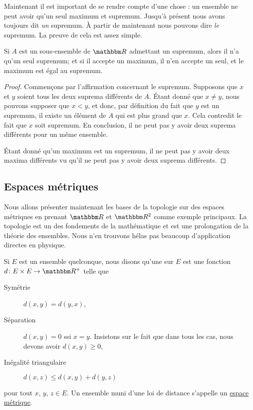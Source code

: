 
Maintenant il est important de se rendre compte d'une chose : un ensemble ne peut avoir qu'un seul maximum et supremum. Jusqu'à présent nous avons toujours dit \emph{un} supremum. À partir de maintenant nous pouvons dire \emph{le} supremum. La preuve de cela est assez simple.
\begin{proposition}
Si $A$ est un sous-ensemble de $\eR$ admettant un supremum, alors il n'a qu'un seul supremum; et si il accepte un maximum, il n'en accepte un seul, et le maximum est égal au supremum.
\end{proposition}

\begin{proof}
Commençons par l'affirmation concernant le supremum. Supposons que $x$ et $y$ soient tous les deux suprema différents de $A$. Étant donné que $x\neq y$, nous pouvons supposer que $x<y$, et donc, par définition du fait que $y$ est un supremum, il existe un élément de $A$ qui est plus grand que $x$. Cela contredit le fait que $x$ soit supremum. En conclusion, il ne peut pas y avoir deux suprema différents pour un même ensemble.

Étant donné qu'un maximum est un supremum, il ne peut pas y avoir deux maxima différents vu qu'il ne peut pas y avoir deux suprema différents.
\end{proof}


\subsection{Espaces métriques}

Nous allons présenter maintenant les bases de la topologie sur des espaces métriques en prenant $\eR$ et $\eR^2$ comme exemple principaux. La topologie est un des fondements de la mathématique et est une prolongation de la théorie des ensembles. Nous n'en trouvons hélas pas beaucoup d'application directes en physique.

Si $E$ est un ensemble quelconque, nous disons qu'une  sur $E$ est une fonction $d\colon E\times E\to \eR^+$ telle que
\begin{description}
\item[Symétrie] $d(x,y)=d(y,x)$,
\item[Séparation] $d(x,y)=0$ ssi $x=y$. Insistons sur le fait que dans tous les cas, nous devons avoir $d(x,y)\geq 0$,
\item[Inégalité triangulaire] $d(x,z)\leq d(x,y)+d(y,z)$
\end{description}
pour tout $x$, $y$, $z\in E$. Un ensemble muni d'une loi de distance s'appelle un \href{http://fr.wikipedia.org/wiki/Espace_métrique}{espace métrique}.

